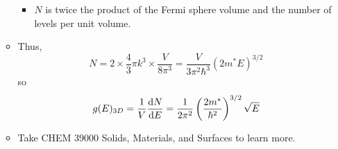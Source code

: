 \documentclass[../notes.tex]{subfiles}
\begin{document}
\begin{itemize}
\begin{itemize}
\begin{itemize}
            \item $N$ is twice the product of the Fermi sphere volume and the number of levels per unit volume.
        \end{itemize}
        \item Thus,
        \begin{equation*}
            N = 2\times\frac{4}{3}\pi k^3\times\frac{V}{8\pi^3} = \frac{V}{3\pi^2\hbar^3}(2m^*E)^{3/2}
        \end{equation*}
        so
        \begin{equation*}
            g(E)_{3D} = \frac{1}{V}\dv{N}{E} = \frac{1}{2\pi^2}\left( \frac{2m^*}{\hbar^2} \right)^{3/2}\sqrt{E}
        \end{equation*}
        \item Take CHEM 39000 Solids, Materials, and Surfaces to learn more.
    \end{itemize}
\end{itemize}
\end{document}
